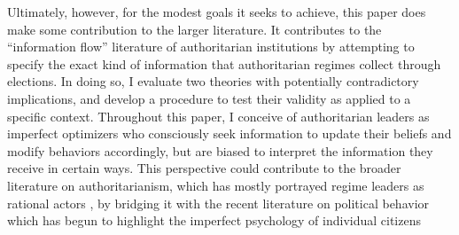 \documentclass[12pt]{article}\usepackage[]{graphicx}\usepackage[]{color}
\newcommand{\1}{\mathbbm{1}}
\begin{document}
Ultimately, however, for the modest goals it seeks to achieve, this paper does make some contribution to the larger literature. It contributes to the ``information flow'' literature of authoritarian institutions by attempting to specify the exact kind of information that authoritarian regimes collect through elections. In doing so, I evaluate two theories with potentially contradictory implications, and develop a procedure to test their validity as applied to a specific context. Throughout this paper, I conceive of authoritarian leaders as imperfect optimizers who consciously seek information to update their beliefs and modify behaviors accordingly, but are biased to interpret the information they receive in certain ways. This perspective could contribute to the broader literature on authoritarianism, which has mostly portrayed regime leaders as rational actors \citep[e.g.][]{AR2001}, by bridging it with the recent literature on political behavior which has begun to highlight the imperfect psychology of individual citizens \citep[e.g.][]{AchenBartels2016}




\end{document}
